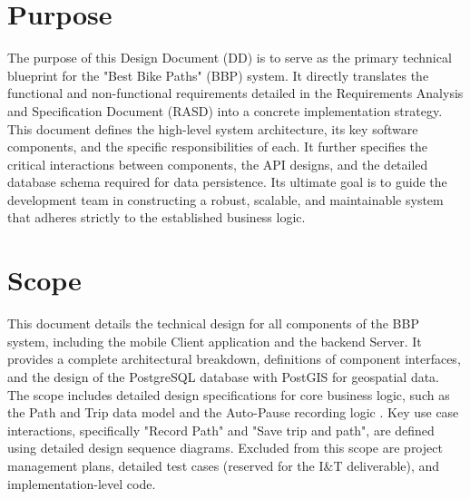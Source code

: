 
\section{Purpose}
\label{sec:purpose}%
The purpose of this Design Document (DD) is to serve as the primary technical blueprint for the "Best Bike Paths" (BBP) system. It directly translates the functional and non-functional requirements detailed in the Requirements Analysis and Specification Document (RASD) into a concrete implementation strategy. This document defines the high-level system architecture, its key software components, and the specific responsibilities of each. It further specifies the critical interactions between components, the API designs, and the detailed database schema required for data persistence. Its ultimate goal is to guide the development team in constructing a robust, scalable, and maintainable system that adheres strictly to the established business logic.

\section{Scope}
\label{sec:scope}%
This document details the technical design for all components of the BBP system, including the mobile Client application and the backend Server. It provides a complete architectural breakdown, definitions of component interfaces, and the design of the PostgreSQL database with PostGIS for geospatial data. The scope includes detailed design specifications for core business logic, such as the Path and Trip data model and the Auto-Pause recording logic . Key use case interactions, specifically "Record Path" and "Save trip and path", are defined using detailed design sequence diagrams. Excluded from this scope are project management plans, detailed test cases (reserved for the I\&T deliverable), and implementation-level code.



